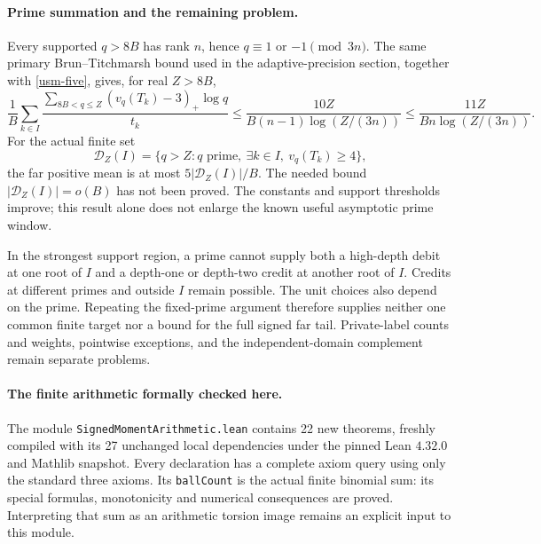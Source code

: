 \paragraph{Prime summation and the remaining problem.}
Every supported \(q>8B\) has rank \(n\), hence \(q\equiv1\) or
\(-1\pmod {3n}\). The same primary Brun--Titchmarsh bound used in
the adaptive-precision section, together with \eqref{usm-five},
gives, for real \(Z>8B\),
\begin{equation}\label{usm-progression}
 \frac1B\sum_{k\in I}
 \frac{\sum_{8B<q\leq Z}(v_q(T_k)-3)_+\log q}{t_k}
 \leq\frac{10Z}{B(n-1)\log(Z/(3n))}
 \leq\frac{11Z}{Bn\log(Z/(3n))}.
\end{equation}
For the actual finite set
\[
 \mathcal D_Z(I)=\{q>Z:q\text{ prime},\
                  \exists k\in I,\ v_q(T_k)\geq4\},
\]
the far positive mean is at most
\(5|\mathcal D_Z(I)|/B\). The needed bound
\(|\mathcal D_Z(I)|=o(B)\) has not been proved. The constants and
support thresholds improve; this result alone does not enlarge
the known useful asymptotic prime window.

In the strongest support region, a prime cannot supply both a
high-depth debit at one root of \(I\) and a depth-one or depth-two
credit at another root of \(I\). Credits at different primes and
outside \(I\) remain possible. The unit choices also depend on the
prime. Repeating the fixed-prime argument therefore supplies
neither one common finite target nor a bound for the full signed
far tail. Private-label counts and weights, pointwise exceptions,
and the independent-domain complement remain separate problems.

\paragraph{The finite arithmetic formally checked here.}
The module
\texttt{SignedMoment\allowbreak Arithmetic.lean} contains
22 new theorems, freshly compiled with its 27 unchanged local
dependencies under the pinned Lean \(4.32.0\) and Mathlib snapshot.
Every declaration has a complete axiom query using only the
standard three axioms. Its \texttt{ballCount} is the actual finite
binomial sum: its special formulas, monotonicity and numerical
consequences are proved. Interpreting that sum as an arithmetic
torsion image remains an explicit input to this module.

